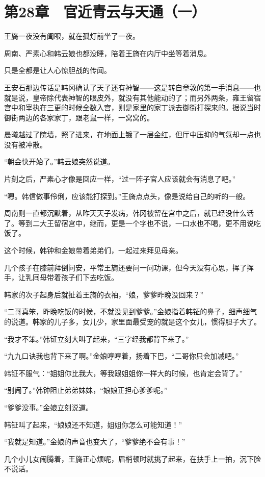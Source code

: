 \section{第28章　官近青云与天通（一）}

王旖一夜没有阖眼，就在孤灯前坐了一夜。

周南、严素心和韩云娘也都没睡，陪着王旖在内厅中坐等着消息。

只是全都是让人心惊胆战的传闻。

王安石那边传话是韩冈确认了天子还有神智——这是转自章敦的第一手消息——也就是说，皇帝除代表神智的眼皮外，就没有其他能动的了；而另外两条，雍王留宿宫中和宰执在三更的时候全数入宫，则是家里的家丁派去御街打探来的。据说当时御街两边的各家家丁，跟老鼠一样，一窝窝的。

晨曦越过了院墙，照了进来，在地面上镀了一层金红，但厅中压抑的气氛却一点也没有被冲散。

“朝会快开始了。”韩云娘突然说道。

片刻之后，严素心才像是回应一样，“过一阵子官人应该就会有消息了吧。”

“嗯。韩信做事伶俐，应该能打探到。”王旖点点头，像是说给自己的听的一般。

周南则一直都沉默着，从昨天天子发病，韩冈被留在宫中之后，就已经没什么话了。等到二大王留宿宫中，继而，更是一个字也不说，一口水也不喝，更不用说吃饭了。

这个时候，韩钟和金娘带着弟弟们，一起过来拜见母亲。

几个孩子在膝前拜倒问安，平常王旖还要问一问功课，但今天没有心思，挥了挥手，让乳囘母带着孩子们下去吃饭。

韩家的次子起身后就扯着王旖的衣袖，“娘，爹爹昨晚没回来？”

“二哥真笨，昨晚吃饭的时候，不就没见到爹爹。”金娘指着韩钲的鼻子，细声细气的说道。韩家的儿子多，女儿少，家里面最受宠的就是这个女儿，惯得胆子大了。

“我才不笨。”韩钲立刻大叫了起来，“三字经我都背下来了。”

“九九口诀我也背下来了啊。”金娘哼哼着，扬着下巴，“二哥你只会加减吧。”

韩钲不服气：“姐姐你比我大，等我跟姐姐你一样大的时候，也肯定会背了。”

“别闹了。”韩钟阻止弟弟妹妹，“娘娘正担心爹爹呢。”

“爹爹没事。”金娘立刻说道。

韩钲叫了起来，“娘娘还不知道，姐姐你怎么可能知道！”

“我就是知道。”金娘的声音也变大了，“爹爹绝不会有事！”

几个小儿女闹腾着，王旖正心烦呢，眉梢顿时就挑了起来，在扶手上一拍，沉下脸不说话。


